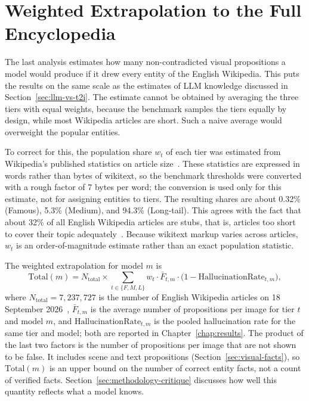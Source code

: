 \section{Weighted Extrapolation to the Full Encyclopedia}
\label{sec:weighted-extrapolation}

The last analysis estimates how many non-contradicted visual propositions a
model would produce if it drew every entity of the English Wikipedia. This puts the results
on the same scale as the estimates of LLM knowledge discussed in
Section~\ref{sec:llm-vs-t2i}. The estimate cannot be obtained by averaging the
three tiers with equal weights, because the benchmark samples the tiers equally
by design, while most Wikipedia articles are short. Such a naive average would
overweight the popular entities.

To correct for this, the population share $w_t$ of each tier was estimated
from Wikipedia's published statistics on article
size~\citep{wikipediaarticlesize2026}. These statistics are expressed in words
rather than bytes of wikitext, so the benchmark thresholds were converted with a
rough factor of 7 bytes per word; the conversion is used only for this
estimate, not for assigning entities to tiers. The resulting shares are about
0.32\% (Famous), 5.3\% (Medium), and 94.3\% (Long-tail). This agrees with the
fact that about 32\% of all English Wikipedia articles are stubs, that is,
articles too short to cover their topic adequately~\citep{wikipediastub2026}.
Because wikitext markup varies across articles, $w_t$ is an order-of-magnitude
estimate rather than an exact population statistic.

The weighted extrapolation for model $m$ is
\begin{equation}
\mathrm{Total}(m) = N_{\text{total}} \times \sum_{t \in \{F,M,L\}}
w_t \cdot \bar{F}_{t,m} \cdot \bigl(1 - \mathrm{HallucinationRate}_{t,m}\bigr),
\label{eq:weighted-extrapolation}
\end{equation}
where $N_{\text{total}} = 7{,}237{,}727$ is the number of English Wikipedia
articles on 18 September 2026~\citep{wikipediasize2026}, $\bar{F}_{t,m}$ is the
average number of propositions per image for tier $t$ and model $m$, and
$\mathrm{HallucinationRate}_{t,m}$ is the pooled hallucination rate for the
same tier and model; both are reported in Chapter~\ref{chap:results}. The
product of the last two factors is the number of propositions per image that
are not shown to be false. It includes scene and
text propositions (Section~\ref{sec:visual-facts}), so $\mathrm{Total}(m)$ is
an upper bound on the number of correct entity facts, not a count of verified
facts. Section~\ref{sec:methodology-critique} discusses how well this quantity
reflects what a model knows.


